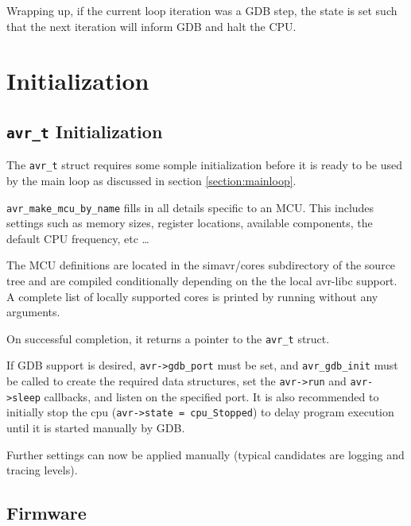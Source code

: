 Wrapping up, if the current loop iteration was a \ac{GDB} step, the state is set
such that the next iteration will inform \ac{GDB} and halt the \ac{CPU}.


\section{Initialization}

\subsection{\lstinline|avr_t| Initialization} \label{subsection:avr_t_initialization}

The \lstinline|avr_t| struct requires some somple initialization before it is
ready to be used by the main loop as discussed in section \ref{section:mainloop}.

\lstinline|avr_make_mcu_by_name| fills in all details specific to an \ac{MCU}. This
includes settings such as memory sizes, register locations, available components,
the default \ac{CPU} frequency, etc \ldots

The \ac{MCU} definitions are located in the simavr/cores subdirectory of the \simavr
source tree and are compiled conditionally depending on the the local avr-libc
support. A complete list of locally supported cores is printed by running \simavr
without any arguments.

On successful completion, it returns a pointer to the \lstinline|avr_t| struct.

If \ac{GDB} support is desired, \lstinline|avr->gdb_port| must be set, and
\lstinline|avr_gdb_init| must be called to create the required data structures,
set the \lstinline|avr->run| and \lstinline|avr->sleep| callbacks, and listen
on the specified port. It is also recommended to initially stop the cpu
(\lstinline|avr->state = cpu_Stopped|) to delay program execution until it
is started manually by \ac{GDB}.

Further settings can now be applied manually (typical candidates are logging and
tracing levels).

\subsection{Firmware} \label{subsection:initialization_firmware}


